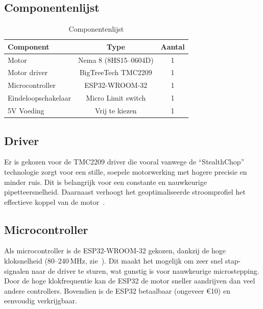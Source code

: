 \subsection{Componentenlijst}
\begin{minipage}{\linewidth}
    \begin{table}[H]
        \centering
        \caption{Componentenlijst}\label{tab:componentenlijst}
            \centering
            \begin{tabular}{|l|c|c|}
                \hline
                \textbf{Component} & \textbf{Type} & \textbf{Aantal} \\
                \hline
                Motor & Nema 8 (8HS15--0604D) & 1 \\
                Motor driver & BigTreeTech TMC2209 & 1 \\
                Microcontroller & ESP32-WROOM-32 & 1 \\
                Eindeloopschakelaar & Micro Limit switch & 1 \\
                5V Voeding & Vrij te kiezen\footnotemark{} & 1 \\
                \hline
            \end{tabular}
    \end{table}
\subsection{Driver}
Er is gekozen voor de TMC2209 driver die vooral vanwege de ``StealthChop'' technologie zorgt voor een stille, soepele motorwerking met hogere precisie en minder ruis. Dit is belangrijk voor een constante en nauwkeurige pipetteersnelheid. Daarnaast verhoogt het geoptimaliseerde stroomprofiel het effectieve koppel van de motor\ \cite{RN45}.

\subsection{Microcontroller}
Als microcontroller is de ESP32-WROOM-32 gekozen, dankzij de hoge kloksnelheid (80–240\,MHz, zie\ \cite{RN47}). Dit maakt het mogelijk om zeer snel stap-signalen naar de driver te sturen, wat gunstig is voor nauwkeurige microstepping. Door de hoge klokfrequentie kan de ESP32 de motor sneller aandrijven dan veel andere controllers. Bovendien is de ESP32 betaalbaar (ongeveer €10) en eenvoudig verkrijgbaar.

\end{minipage}
